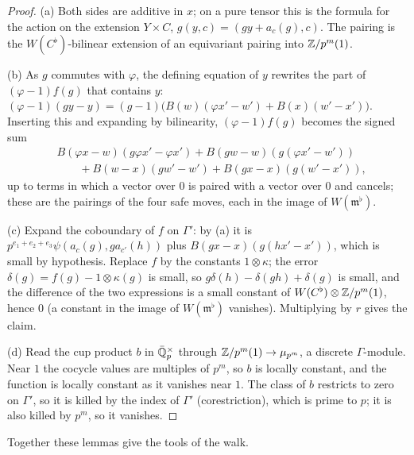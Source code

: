 \begin{proof}
(a) Both sides are additive in $x$; on a pure tensor this is the formula for the action on the extension $Y\times C$, $g(y,c)=(gy+a_c(g),c)$. The pairing is the $W(C^\flat)$-bilinear extension of an equivariant pairing into $\mathbb{Z}/p^m(1)$.

(b) As $g$ commutes with $\varphi$, the defining equation of $y$ rewrites the part of $(\varphi-1)f(g)$ that contains $y$: $(\varphi-1)(gy-y)=(g-1)\bigl(B(w)(\varphi x'-w')+B(x)(w'-x')\bigr)$. Inserting this and expanding by bilinearity, $(\varphi-1)f(g)$ becomes the signed sum
\begin{align*}&B(\varphi x-w)(g\varphi x'-\varphi x')+B(gw-w)(g(\varphi x'-w'))\\&\qquad+B(w-x)(gw'-w')+B(gx-x)(g(w'-x')),\end{align*}
up to terms in which a vector over $0$ is paired with a vector over $0$ and cancels; these are the pairings of the four safe moves, each in the image of $W(\mathfrak m^\flat)$.

(c) Expand the coboundary of $f$ on $\Gamma'$: by (a) it is $p^{e_1+e_2+e_3}\psi(a_c(g),ga_{c'}(h))$ plus $B(gx-x)(g(hx'-x'))$, which is small by hypothesis. Replace $f$ by the constants $1\otimes\kappa$; the error $\delta(g)=f(g)-1\otimes\kappa(g)$ is small, so $g\delta(h)-\delta(gh)+\delta(g)$ is small,
and the difference of the two expressions is a small constant of $W(C^\flat)\otimes\mathbb{Z}/p^m(1)$, hence $0$ (a constant in the image of $W(\mathfrak m^\flat)$ vanishes). Multiplying by $r$ gives the claim.

(d) Read the cup product $b$ in $\bar{\mathbb{Q}}_p^\times$ through $\mathbb{Z}/p^m(1)\to\mu_{p^m}$, a discrete $\Gamma$-module. Near $1$ the cocycle values are multiples of $p^m$, so $b$ is locally constant, and the function is locally constant as it vanishes near $1$. The class of $b$ restricts to zero on $\Gamma'$, so it is killed by the index
of $\Gamma'$ (corestriction), which is prime to $p$; it is also killed by $p^m$, so it vanishes.
\end{proof}

Together these lemmas give the tools of the walk.

